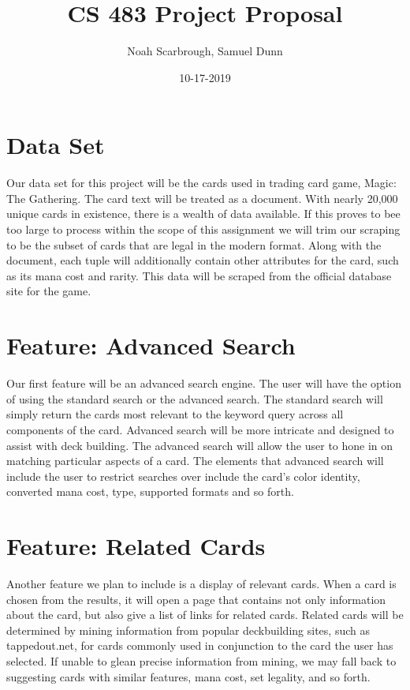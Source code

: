 \documentclass{article}
\title{CS 483 Project Proposal}
\author{Noah Scarbrough, Samuel Dunn}
\date{10-17-2019}
\begin{document}
\maketitle

\section{Data Set}
Our data set for this project will be the cards used in trading card game,
Magic: The Gathering. The card text will be treated as a document. 
With nearly 20,000 unique cards in existence, there is a wealth of data available.
If this proves to bee too large to process within the scope of this assignment we will
trim our scraping to be the subset of cards that are legal in the modern format. 
Along with the document, each tuple will additionally contain other attributes for the card, such as its mana cost and rarity. 
This data will be scraped from the official database site for the game.

\section{Feature: Advanced Search}
Our first feature will be an advanced search engine. 
The user will have the option of using the standard search or the advanced search. 
The standard search will simply return the cards most relevant to the keyword query across all components of the card. 
Advanced search will be more intricate and designed to assist with deck building. The advanced search will allow the 
user to hone in on matching particular aspects of a card. The elements that advanced search will include the user 
to restrict searches over include the card's color identity, converted mana cost, type, supported formats and so forth.

\section{Feature: Related Cards}
Another feature we plan to include is a display of relevant cards. 
When a card is chosen from the results, it will open a page that 
contains not only information about the card, but also give a list 
of links for related cards. Related cards will be determined by mining
information from popular deckbuilding sites, such as tappedout.net, for
cards commonly used in conjunction to the card the user has selected. 
If unable to glean precise information from mining, we may fall back
to suggesting cards with similar features, mana cost, set legality, and so forth.
\end{document}
